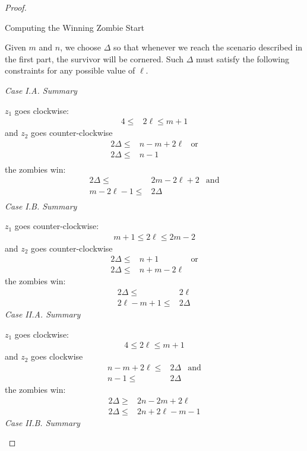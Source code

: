 \begin{proof}
 \begin{proofpart} Computing the Winning Zombie Start

  Given $m$ and $n$, we choose $\Delta$ so that whenever we reach
  the scenario described in the first part, the survivor will be cornered.
  Such $\Delta$ must satisfy the following constraints for any possible
  value of $\ell$.

  \textit{Case I.A. Summary}

  $z_1$ goes clockwise:
  \begin{align*}
   4 \leq & 2 \ell \leq m + 1
  \end{align*}
  and $z_2$ goes counter-clockwise
  \begin{align*}
   2 \Delta \leq & n - m + 2\ell & \text{or} \\
   2 \Delta \leq & n - 1                     \\
  \end{align*}
  the zombies win:
  \begin{align*}
   2 \Delta \leq      & 2 m- 2 \ell + 2 & \text{and} \\
   m - 2\ell  -1 \leq & 2 \Delta                     \\
  \end{align*}
  \textit{Case I.B. Summary}

  $z_1$ goes counter-clockwise:
  \begin{align*}
   m + 1 \leq 2 \ell \leq 2m - 2
  \end{align*}
  and $z_2$ goes counter-clockwise
  \begin{align*}
   2 \Delta \leq & n + 1         & \text{or} \\
   2 \Delta \leq & n + m - 2\ell
  \end{align*}
  the zombies win:
  \begin{align*}
   2 \Delta \leq      & 2 \ell   \\
   2\ell - m + 1 \leq & 2 \Delta
  \end{align*}
  \textit{Case II.A. Summary}

  $z_1$ goes clockwise:
  \begin{align*}
   4 \leq 2 \ell \leq m + 1
  \end{align*}
  and $z_2$ goes clockwise
  \begin{align*}
   n -m + 2\ell \leq & 2 \Delta & \text{and} \\
   n-1 \leq          & 2 \Delta
  \end{align*}
  the zombies win:
  \begin{align*}
   2 \Delta \geq & 2n - 2m + 2\ell    \\
   2 \Delta \leq & 2n + 2\ell - m - 1
  \end{align*}
  \textit{Case II.B. Summary}


\end{proofpart}
\end{proof}
